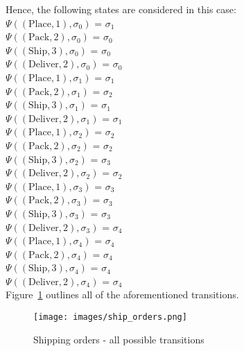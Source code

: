 \documentclass[a4paper]{article}
\begin{document}
Hence, the following states are considered in this case: \\[0.5\baselineskip] 
$\Psi((\text{Place},1),\sigma_0)$ = $\sigma_1$ \\[0.1\baselineskip] 
$\Psi((\text{Pack},2),\sigma_0)$ = $\sigma_0$ \\[0.1\baselineskip] 
$\Psi((\text{Ship},3),\sigma_0)$ = $\sigma_0$ \\[0.1\baselineskip] 
$\Psi((\text{Deliver},2),\sigma_0)$ = $\sigma_0$ \\[0.7\baselineskip]
$\Psi((\text{Place},1),\sigma_1)$ = $\sigma_1$ \\[0.1\baselineskip] 
$\Psi((\text{Pack},2),\sigma_1)$ = $\sigma_2$ \\[0.1\baselineskip] 
$\Psi((\text{Ship},3),\sigma_1)$ = $\sigma_1$ \\[0.1\baselineskip] 
$\Psi((\text{Deliver},2),\sigma_1)$ = $\sigma_1$ \\[0.7\baselineskip] 
$\Psi((\text{Place},1),\sigma_2)$ = $\sigma_2$ \\[0.1\baselineskip] 
$\Psi((\text{Pack},2),\sigma_2)$ = $\sigma_2$ \\[0.1\baselineskip] 
$\Psi((\text{Ship},3),\sigma_2)$ = $\sigma_3$ \\[0.1\baselineskip] 
$\Psi((\text{Deliver},2),\sigma_2)$ = $\sigma_2$ \\[0.7\baselineskip] 
$\Psi((\text{Place},1),\sigma_3)$ = $\sigma_3$ \\[0.1\baselineskip] 
$\Psi((\text{Pack},2),\sigma_3)$ = $\sigma_3$ \\[0.1\baselineskip] 
$\Psi((\text{Ship},3),\sigma_3)$ = $\sigma_3$ \\[0.1\baselineskip] 
$\Psi((\text{Deliver},2),\sigma_3)$ = $\sigma_4$ \\[0.7\baselineskip] 
$\Psi((\text{Place},1),\sigma_4)$ = $\sigma_4$ \\[0.1\baselineskip] 
$\Psi((\text{Pack},2),\sigma_4)$ = $\sigma_4$ \\[0.1\baselineskip] 
$\Psi((\text{Ship},3),\sigma_4)$ = $\sigma_4$ \\[0.1\baselineskip] 
$\Psi((\text{Deliver},2),\sigma_4)$ = $\sigma_4$ \\[0.7\baselineskip] 
Figure~\ref{fig:shipping_transitions} outlines all of the aforementioned transitions.
\begin{figure}[H]
    \centering
    \texttt{[image: images/ship\_orders.png]}
    \caption{Shipping orders - all possible transitions}
    \label{fig:shipping_transitions}
\end{figure}
\end{document}

